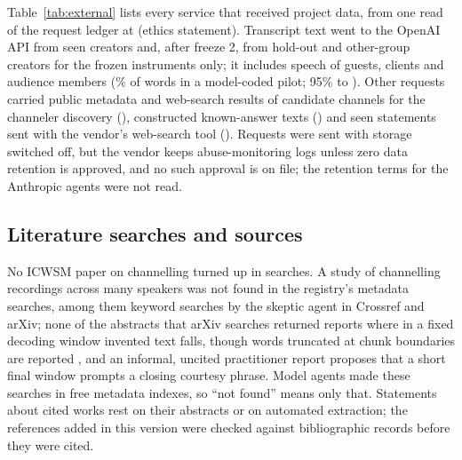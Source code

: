 Table~\ref{tab:external} lists every service that received project data, from one read of the request ledger at
\ExtStamp{} (ethics statement). Transcript text went to the OpenAI API from seen creators and, after freeze 2, from
hold-out and other-group creators for the frozen instruments only; it includes speech of guests, clients and audience
members (\ThirdPartySharePct\% of words in a model-coded pilot; 95\% \ThirdPartyShareLo{} to \ThirdPartyShareHi). Other
requests carried public metadata and web-search results of candidate channels for the channeler discovery
(\ExtDiscoveryRequests), constructed known-answer texts (\ExtKnownAnswerRequests) and seen statements sent with the
vendor's web-search tool (\ExtWebStatementRequests). Requests were sent with storage switched off, but the vendor keeps
abuse-monitoring logs unless zero data retention is approved, and no such approval is on file; the retention terms for
the Anthropic agents were not read.

\begin{table}[tp]
\centering
\small

\caption{External processing of project data, from one read of the request ledger at \ExtStamp: \ExtRequests{}
requests to the language-model API and \ExtInputTokensM{} million input tokens, which the rows sum to, and about
\ExtWordsM{} million words of transcript-derived text with repeats (an estimate; words are not logged). Rows other than
transcript windows carry constructed texts, public metadata of candidate channels, or tests. Third-party share:
model-coded voice-map pilot, 95\% creator bootstrap. Retention as each vendor documents it; the Anthropic terms were not
read. This inventory is not an ethics determination. \LabelValidity}
\label{tab:external}
\end{table}

\subsection{Literature searches and sources}
\label{app:searches}

No ICWSM paper on channelling turned up in \NIcwsmSearches{} searches. A study of channelling recordings across many
speakers was not found in the registry's metadata searches, among them \NSkepticSearches{} keyword searches by the
skeptic agent in Crossref and arXiv; none of the abstracts that \NSeamSearches{} arXiv searches returned reports where in
a fixed decoding window invented text falls, though words truncated at chunk boundaries are reported
\cite{wang2024simulwhisper}, and an informal, uncited practitioner report proposes that a short final window prompts
a closing courtesy phrase. Model agents made these searches in free metadata indexes, so ``not
found'' means only that. Statements about cited works rest on their abstracts or on automated extraction; the references
added in this version were checked against bibliographic records before they were cited.
